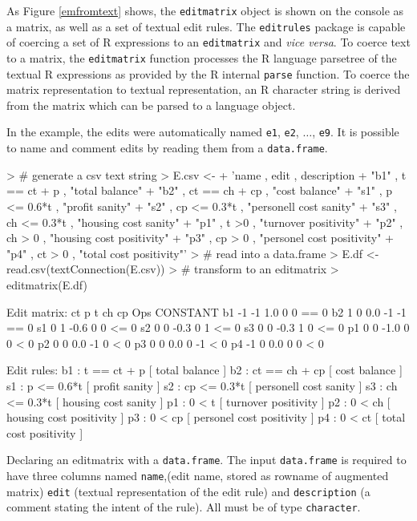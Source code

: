 \documentclass[10pt, fleqn, a4paper]{article}
\begin{document}
As Figure \ref{emfromtext} shows, the {\tt editmatrix} object is shown on the console
as a matrix, as well as a set of textual edit rules. The {\tt editrules}
package is capable of coercing a set of R expressions to an {\tt editmatrix}
and {\em vice versa}. To coerce text to a matrix, the {\tt editmatrix} function
processes the R language parsetree of the textual R expressions as provided by
the R internal {\tt parse} function. To coerce the matrix representation to
textual representation, an R character string is derived from the matrix which
can be parsed to a language object.

In the example, the edits were automatically named {\tt e1}, {\tt e2}, $\ldots$, {\tt e9}. It is
possible to name and comment edits by reading them from a {\tt data.frame}. 

\begin{Rcode}[t]
\begin{Schunk}
\begin{Sinput}
> # generate a csv text string
> E.csv <- 
+ 'name , edit       , description
+ "b1"  ,    t == ct + p    ,  "total balance"
+ "b2"  ,    ct == ch + cp  ,  "cost balance"
+ "s1"  ,    p <= 0.6*t     ,  "profit sanity"
+ "s2"  ,    cp <= 0.3*t    ,  "personell cost sanity"
+ "s3"  ,    ch <= 0.3*t    ,  "housing cost sanity"
+ "p1"  ,    t >0           ,  "turnover positivity"
+ "p2"  ,    ch > 0         ,  "housing cost positivity"
+ "p3"  ,    cp > 0         ,  "personel cost positivity"
+ "p4"  ,    ct > 0         ,  "total cost positivity"'
> # read into a data.frame
> E.df <- read.csv(textConnection(E.csv))
> # transform to an editmatrix
> editmatrix(E.df)
\end{Sinput}
\begin{Soutput}
Edit matrix:
     ct  p    t ch cp Ops CONSTANT
b1   -1 -1  1.0  0  0  ==        0
b2    1  0  0.0 -1 -1  ==        0
s1    0  1 -0.6  0  0  <=        0
s2    0  0 -0.3  0  1  <=        0
s3    0  0 -0.3  1  0  <=        0
p1    0  0 -1.0  0  0   <        0
p2    0  0  0.0 -1  0   <        0
p3    0  0  0.0  0 -1   <        0
p4   -1  0  0.0  0  0   <        0

Edit rules:
b1   : t == ct + p [   total balance ]
b2   : ct == ch + cp [   cost balance ]
s1   : p <= 0.6*t [   profit sanity ]
s2   : cp <= 0.3*t [   personell cost sanity ]
s3   : ch <= 0.3*t [   housing cost sanity ]
p1   : 0 < t [   turnover positivity ]
p2   : 0 < ch [   housing cost positivity ]
p3   : 0 < cp [   personel cost positivity ]
p4   : 0 < ct [   total cost positivity ] 
\end{Soutput}
\end{Schunk}
\caption{Declaring an editmatrix with a {\tt data.frame}. The input {\tt data.frame} is required to have three columns named
{\tt name},(edit name, stored as rowname of augmented matrix) {\tt edit} (textual representation of the edit rule) 
and {\tt description} (a comment stating the intent of the rule). All must be of type {\tt character}.}
\end{Rcode}
%
\end{document}
